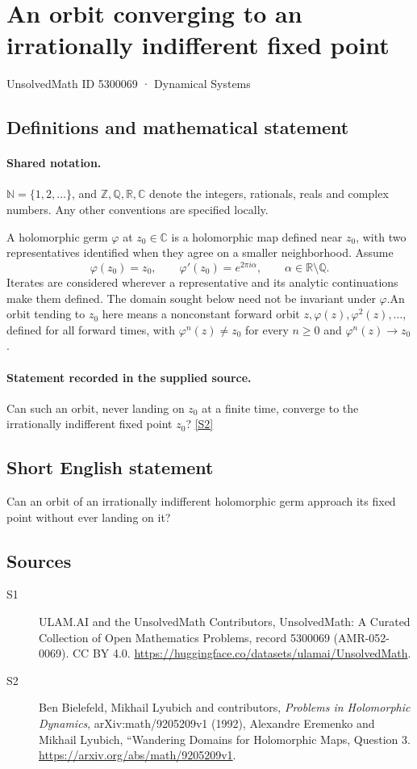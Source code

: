 \documentclass[11pt]{article}
\newcommand{\sref}[2]{\hyperlink{source:#1:#2}{[S#2]}}
\begin{document}
\setcounter{section}{5300068}
\section{An orbit converging to an irrationally indifferent fixed point}\label{5300069}
{\small\sffamily UnsolvedMath ID 5300069 · Dynamical Systems}
\subsection{Definitions and mathematical statement}

\paragraph{Shared notation.}$\mathbb N=\{1,2,\ldots\}$, and $\mathbb Z,\mathbb Q,\mathbb R,\mathbb C$ denote the integers, rationals, reals and complex numbers. Any other conventions are specified locally.


A holomorphic germ $\varphi$ at $z_0\in\mathbb C$ is a holomorphic map defined near $z_0$, with two representatives identified when they agree on a smaller neighborhood. Assume
\[\varphi(z_0)=z_0,\qquad \varphi'(z_0)=e^{2\pi i\alpha},\qquad \alpha\in\mathbb R\setminus\mathbb Q.\]
Iterates are considered wherever a representative and its analytic continuations make them defined. The domain sought below need not be invariant under $\varphi$.An orbit tending to $z_0$ here means a nonconstant forward orbit $z,\varphi(z),\varphi^2(z),\ldots$, defined for all forward times, with $\varphi^n(z)\ne z_0$ for every $n\geq0$ and $\varphi^n(z)\to z_0$.
\paragraph{Statement recorded in the supplied source.}
Can such an orbit, never landing on $z_0$ at a finite time, converge to the irrationally indifferent fixed point $z_0$? \sref{5300069}{2}
\subsection{Short English statement}
Can an orbit of an irrationally indifferent holomorphic germ approach its fixed point without ever landing on it?
\subsection{Sources}
\begin{description}
\item[\hypertarget{source:5300069:1}{S1}] ULAM.AI and the UnsolvedMath Contributors, UnsolvedMath: A Curated Collection of Open Mathematics Problems, record 5300069 (AMR-052-0069). CC BY 4.0. \url{https://huggingface.co/datasets/ulamai/UnsolvedMath}.
\item[\hypertarget{source:5300069:2}{S2}] Ben Bielefeld, Mikhail Lyubich and contributors, \emph{Problems in Holomorphic Dynamics}, arXiv:math/9205209v1 (1992), Alexandre Eremenko and Mikhail Lyubich, ``Wandering Domains for Holomorphic Maps, Question 3. \url{https://arxiv.org/abs/math/9205209v1}.
\end{description}
\label{end:5300069}
\end{document}
